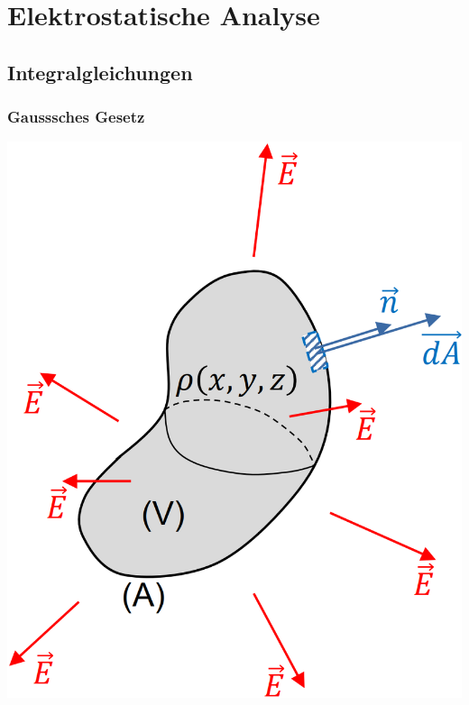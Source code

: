 \section{Elektrostatische Analyse}
\subsection{Integralgleichungen}
\subsubsection{Gausssches Gesetz}
\begin{minipage}[c]{0.31\columnwidth}
    \includegraphics[width=\columnwidth]{images/V1B0.png}
\end{minipage}
\hfill

